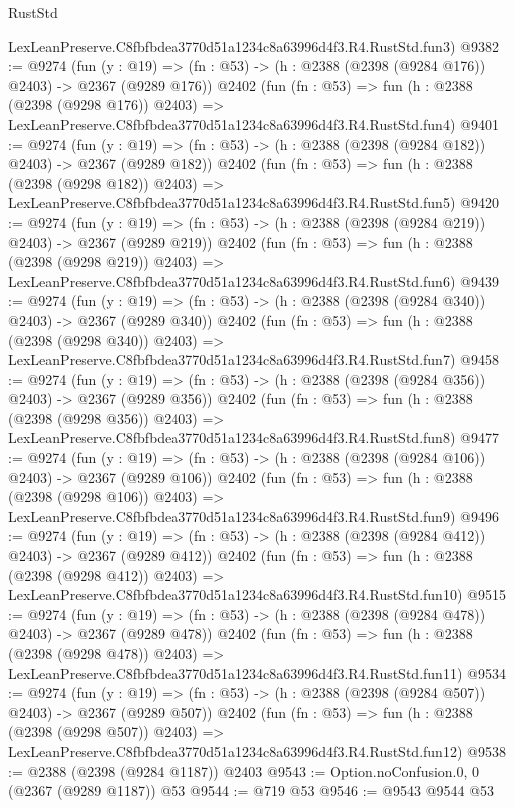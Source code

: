 \begin{lexlean}{RustStd}
\begin{coremodule}
    LexLeanPreserve.C8fbfbdea3770d51a1234c8a63996d4f3.R4.RustStd.fun3)
@9382 := @9274
    (fun (y : @19) => (fn : @53) -> (h : @2388 (@2398 (@9284 @176)) @2403) -> @2367 (@9289 @176))
    @2402
    (fun (fn : @53) =>
    fun (h : @2388 (@2398 (@9298 @176)) @2403) =>
    LexLeanPreserve.C8fbfbdea3770d51a1234c8a63996d4f3.R4.RustStd.fun4)
@9401 := @9274
    (fun (y : @19) => (fn : @53) -> (h : @2388 (@2398 (@9284 @182)) @2403) -> @2367 (@9289 @182))
    @2402
    (fun (fn : @53) =>
    fun (h : @2388 (@2398 (@9298 @182)) @2403) =>
    LexLeanPreserve.C8fbfbdea3770d51a1234c8a63996d4f3.R4.RustStd.fun5)
@9420 := @9274
    (fun (y : @19) => (fn : @53) -> (h : @2388 (@2398 (@9284 @219)) @2403) -> @2367 (@9289 @219))
    @2402
    (fun (fn : @53) =>
    fun (h : @2388 (@2398 (@9298 @219)) @2403) =>
    LexLeanPreserve.C8fbfbdea3770d51a1234c8a63996d4f3.R4.RustStd.fun6)
@9439 := @9274
    (fun (y : @19) => (fn : @53) -> (h : @2388 (@2398 (@9284 @340)) @2403) -> @2367 (@9289 @340))
    @2402
    (fun (fn : @53) =>
    fun (h : @2388 (@2398 (@9298 @340)) @2403) =>
    LexLeanPreserve.C8fbfbdea3770d51a1234c8a63996d4f3.R4.RustStd.fun7)
@9458 := @9274
    (fun (y : @19) => (fn : @53) -> (h : @2388 (@2398 (@9284 @356)) @2403) -> @2367 (@9289 @356))
    @2402
    (fun (fn : @53) =>
    fun (h : @2388 (@2398 (@9298 @356)) @2403) =>
    LexLeanPreserve.C8fbfbdea3770d51a1234c8a63996d4f3.R4.RustStd.fun8)
@9477 := @9274
    (fun (y : @19) => (fn : @53) -> (h : @2388 (@2398 (@9284 @106)) @2403) -> @2367 (@9289 @106))
    @2402
    (fun (fn : @53) =>
    fun (h : @2388 (@2398 (@9298 @106)) @2403) =>
    LexLeanPreserve.C8fbfbdea3770d51a1234c8a63996d4f3.R4.RustStd.fun9)
@9496 := @9274
    (fun (y : @19) => (fn : @53) -> (h : @2388 (@2398 (@9284 @412)) @2403) -> @2367 (@9289 @412))
    @2402
    (fun (fn : @53) =>
    fun (h : @2388 (@2398 (@9298 @412)) @2403) =>
    LexLeanPreserve.C8fbfbdea3770d51a1234c8a63996d4f3.R4.RustStd.fun10)
@9515 := @9274
    (fun (y : @19) => (fn : @53) -> (h : @2388 (@2398 (@9284 @478)) @2403) -> @2367 (@9289 @478))
    @2402
    (fun (fn : @53) =>
    fun (h : @2388 (@2398 (@9298 @478)) @2403) =>
    LexLeanPreserve.C8fbfbdea3770d51a1234c8a63996d4f3.R4.RustStd.fun11)
@9534 := @9274
    (fun (y : @19) => (fn : @53) -> (h : @2388 (@2398 (@9284 @507)) @2403) -> @2367 (@9289 @507))
    @2402
    (fun (fn : @53) =>
    fun (h : @2388 (@2398 (@9298 @507)) @2403) =>
    LexLeanPreserve.C8fbfbdea3770d51a1234c8a63996d4f3.R4.RustStd.fun12)
@9538 := @2388 (@2398 (@9284 @1187)) @2403
@9543 := Option.noConfusion.{0, 0} (@2367 (@9289 @1187)) @53
@9544 := @719 @53
@9546 := @9543 @9544 @53

\end{coremodule}
\end{lexlean}
